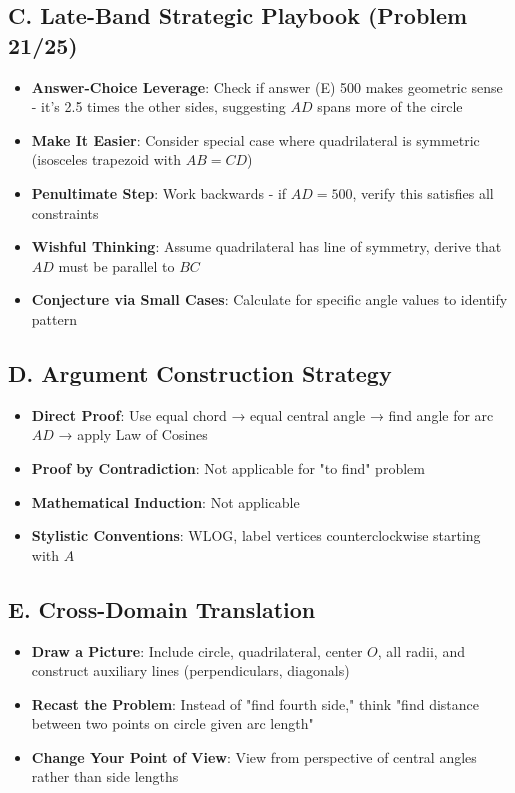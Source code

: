 \documentclass[12pt]{article}
\begin{document}
\begin{strategicbox}
\subsection*{C. Late-Band Strategic Playbook (Problem 21/25)}
\begin{itemize}[leftmargin=*]
    \item \textbf{Answer-Choice Leverage}: Check if answer (E) 500 makes geometric sense - it's 2.5 times the other sides, suggesting $AD$ spans more of the circle
    \item \textbf{Make It Easier}: Consider special case where quadrilateral is symmetric (isosceles trapezoid with $AB = CD$)
    \item \textbf{Penultimate Step}: Work backwards - if $AD = 500$, verify this satisfies all constraints
    \item \textbf{Wishful Thinking}: Assume quadrilateral has line of symmetry, derive that $AD$ must be parallel to $BC$
    \item \textbf{Conjecture via Small Cases}: Calculate for specific angle values to identify pattern
\end{itemize}

\subsection*{D. Argument Construction Strategy}
\begin{itemize}[leftmargin=*]
    \item \textbf{Direct Proof}: Use equal chord → equal central angle → find angle for arc $AD$ → apply Law of Cosines
    \item \textbf{Proof by Contradiction}: Not applicable for "to find" problem
    \item \textbf{Mathematical Induction}: Not applicable
    \item \textbf{Stylistic Conventions}: WLOG, label vertices counterclockwise starting with $A$
\end{itemize}

\subsection*{E. Cross-Domain Translation}
\begin{itemize}[leftmargin=*]
    \item \textbf{Draw a Picture}: Include circle, quadrilateral, center $O$, all radii, and construct auxiliary lines (perpendiculars, diagonals)
    \item \textbf{Recast the Problem}: Instead of "find fourth side," think "find distance between two points on circle given arc length"
    \item \textbf{Change Your Point of View}: View from perspective of central angles rather than side lengths
\end{itemize}
\end{strategicbox}
\end{document}
